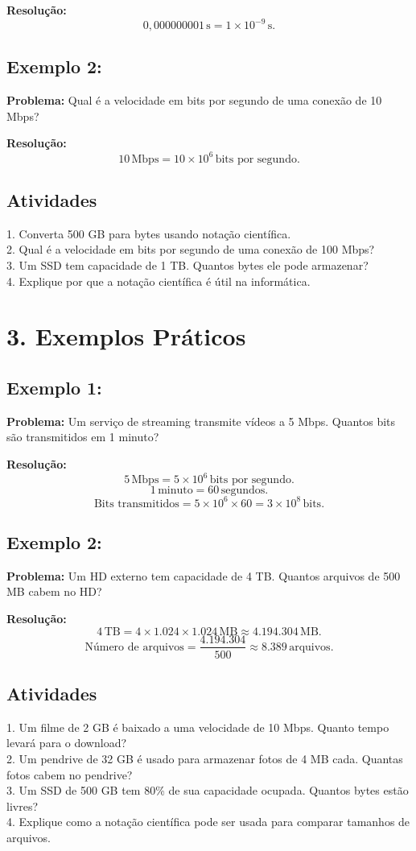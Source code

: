 \documentclass[11pt]{article}
\begin{document}
\begin{multicols}{2}
\textbf{Resolução:}
\[
0,000000001 \, \text{s} = 1 \times 10^{-9} \, \text{s}.
\]

\subsection*{Exemplo 2:}
\textbf{Problema:} Qual é a velocidade em bits por segundo de uma conexão de 10 Mbps?

\textbf{Resolução:}
\[
10 \, \text{Mbps} = 10 \times 10^6 \, \text{bits por segundo}.
\]

\subsection*{Atividades}
1. Converta 500 GB para bytes usando notação científica. \\
2. Qual é a velocidade em bits por segundo de uma conexão de 100 Mbps? \\
3. Um SSD tem capacidade de 1 TB. Quantos bytes ele pode armazenar? \\
4. Explique por que a notação científica é útil na informática.

\section*{3. Exemplos Práticos}

\subsection*{Exemplo 1:}
\textbf{Problema:} Um serviço de streaming transmite vídeos a 5 Mbps. Quantos bits são transmitidos em 1 minuto?

\textbf{Resolução:}
\[
5 \, \text{Mbps} = 5 \times 10^6 \, \text{bits por segundo}.
\]
\[
1 \, \text{minuto} = 60 \, \text{segundos}.
\]
\[
\text{Bits transmitidos} = 5 \times 10^6 \times 60 = 3 \times 10^8 \, \text{bits}.
\]

\subsection*{Exemplo 2:}
\textbf{Problema:} Um HD externo tem capacidade de 4 TB. Quantos arquivos de 500 MB cabem no HD?

\textbf{Resolução:}
\[
4 \, \text{TB} = 4 \times 1.024 \times 1.024 \, \text{MB} \approx  4.194.304 \, \text{MB}.
\]
\[
\text{Número de arquivos} = \frac{4.194.304}{500} \approx 8.389 \, \text{arquivos}.
\]

\subsection*{Atividades}
1. Um filme de 2 GB é baixado a uma velocidade de 10 Mbps. Quanto tempo levará para o download? \\
2. Um pendrive de 32 GB é usado para armazenar fotos de 4 MB cada. Quantas fotos cabem no pendrive? \\
3. Um SSD de 500 GB tem 80\% de sua capacidade ocupada. Quantos bytes estão livres? \\
4. Explique como a notação científica pode ser usada para comparar tamanhos de arquivos.


\end{multicols}
\end{document}
